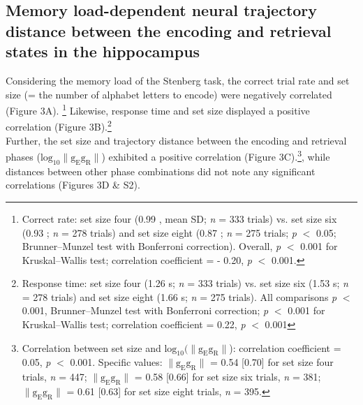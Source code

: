 \documentclass[final,3p,times,twocolumn]{elsarticle}
\begin{document}
\subsection{Memory load-dependent neural trajectory distance between the encoding and retrieval states in the hippocampus}
Considering the memory load of the Stenberg task, the correct trial rate and set size (= the number of alphabet letters to encode) were negatively correlated (Figure 3A). \footnote{Correct rate: set size four (0.99 , mean \textpm SD; \textit{n} = 333 trials) vs. set size six (0.93 ; \textit{n} = 278 trials) and set size eight (0.87 ; \textit{n} = 275 trials; \textit{p} $<$ 0.05; Brunner--Munzel test with Bonferroni correction). Overall, \textit{p} $<$ 0.001 for Kruskal--Wallis test; correlation coefficient = - 0.20, \textit{p} $<$ 0.001.} Likewise, response time and set size displayed a positive correlation (Figure 3B).\footnote{Response time: set size four (1.26  s; \textit{n} = 333 trials) vs. set size six (1.53  s; \textit{n} = 278 trials) and set size eight (1.66  s; \textit{n} = 275 trials). All comparisons \textit{p} $<$ 0.001, Brunner--Munzel test with Bonferroni correction; \textit{p} $<$ 0.001 for Kruskal--Wallis test; correlation coefficient = 0.22, \textit{p} $<$ 0.001}
\\
\indent
Further, the set size and trajectory distance between the encoding and retrieval phases ($\mathrm{log_{10}\lVert g_{E}g_{R} \rVert}$) exhibited a positive correlation (Figure 3C).\footnote{Correlation between set size and $\mathrm{log_{10}(\lVert g_{E}g_{R} \rVert}$): correlation coefficient = 0.05, \textit{p} $<$ 0.001. Specific values: $\mathrm{\lVert g_{E}g_{R} \rVert}$ = 0.54 [0.70] for set size four trials, \textit{n} = 447; $\mathrm{\lVert g_{E}g_{R} \rVert}$ = 0.58 [0.66] for set size six trials, \textit{n} = 381; $\mathrm{\lVert g_{E}g_{R} \rVert}$ = 0.61 [0.63] for set size eight trials, \textit{n} = 395.}, while distances between other phase combinations did not note any significant correlations (Figures 3D \& S2).
\end{document}
